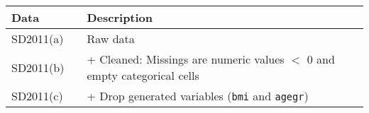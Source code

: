 \begin{tabular}{lll}
    \toprule
Data & & Description \\ \midrule
SD2011(a) && Raw data \\
SD2011(b) && + Cleaned: Missings are numeric values $<$ 0 and empty categorical cells \\
SD2011(c) && + Drop generated variables (\texttt{bmi} and \texttt{agegr}) \\
    \bottomrule
\end{tabular}
